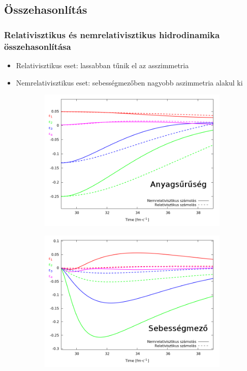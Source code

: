 \documentclass{beamer}
\begin{document}
\subsection{Összehasonlítás}
\begin{frame}
\frametitle{Relativisztikus és nemrelativisztikus hidrodinamika összehasonlítása}
\begin{center}
\begin{itemize}
\setlength{\itemsep}{12pt}
\item<1-> Relativisztikus eset: lassabban tűnik el az asszimmetria
\item<1-> Nemrelativisztikus eset: sebességmezőben nagyobb aszimmetria alakul ki

\end{itemize}
\begin{figure}[H]
	\centering
    \begin{subfigure}[b]{0.49\textwidth}
    		\includegraphics[width=\textwidth]{pic/res/relnonrel_n}
	\end{subfigure}
	\begin{subfigure}[b]{0.49\textwidth}
        	\includegraphics[width=\textwidth]{pic/res/relnonrel_v}
	\end{subfigure}
\end{figure}
\end{center}
\end{frame}
\end{document}
